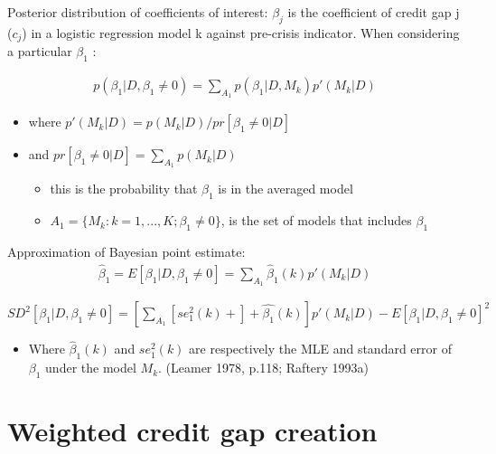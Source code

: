 \documentclass[
  ignorenonframetext,
]{beamer}
\providecommand{\tightlist}{%
  \setlength{\itemsep}{0pt}\setlength{\parskip}{0pt}}
\begin{document}
\begin{frame}{Posterior distribution of coefficients of interest:}
\protect\hypertarget{posterior-distribution-of-coefficients-of-interest}{}
\(\beta_j\) is the coefficient of credit gap j (\(c_j\)) in a logistic
regression model k against pre-crisis indicator. When considering a
particular \(\beta_1\) :

\begin{align*}
p(\beta_1|D, \beta_1\ne 0) = \sum\nolimits_{A_1} p(\beta_1|D,M_k)p'(M_k|D)
\end{align*}

\begin{itemize}
\tightlist
\item
  where \(p'(M_k|D)=p(M_k|D)/ pr[\beta_1 \ne 0|D]\)
\item
  and \(pr[\beta_1 \ne 0|D] = \sum\limits_{A_1} p(M_k|D)\)

  \begin{itemize}
  \tightlist
  \item
    this is the probability that \(\beta_1\) is in the averaged model
  \item
    \(A_1= \{M_k: k=1,...,K; \beta_1 \ne 0\}\), is the set of models
    that includes \(\beta_1\)
  \end{itemize}
\end{itemize}
\end{frame}

\begin{frame}{Approximation of Bayesian point estimate:}
\protect\hypertarget{approximation-of-bayesian-point-estimate}{}
\begin{align}
\hat{\beta}_1 = E[\beta_1|D, \beta_1\ne 0] = \sum\limits_{A_1} \hat{\beta}_1(k)p'(M_k|D)
\end{align}

\(SD^2[\beta_1|D, \beta_1\ne 0] =[\sum\limits_{A_1}[se_1^2(k)+]+\hat{\beta_1}(k)]p'(M_k|D) - E[\beta_1|D, \beta_1\ne 0]^2\)

\begin{itemize}
\tightlist
\item
  Where \(\hat{\beta}_1(k)\) and \(se_1^2(k)\) are respectively the MLE
  and standard error of \(\beta_1\) under the model \(M_k\). (Leamer
  1978, p.118; Raftery 1993a)
\end{itemize}
\end{frame}

\hypertarget{weighted-credit-gap-creation}{%
\section{Weighted credit gap
creation}\label{weighted-credit-gap-creation}}
\end{document}
